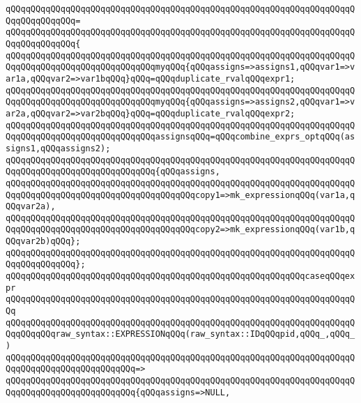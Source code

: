 \verb|qQQqqQQqqQQqqQQqqQQqqQQqqQQqqQQqqQQqqQQqqQQqqQQqqQQqqQQqqQQqqQQqqQQqqQQqqQQqqQQqqQQq=|\newline
\verb|qQQqqQQqqQQqqQQqqQQqqQQqqQQqqQQqqQQqqQQqqQQqqQQqqQQqqQQqqQQqqQQqqQQqqQQqqQQqqQQqqQQq{|\newline
\verb|qQQqqQQqqQQqqQQqqQQqqQQqqQQqqQQqqQQqqQQqqQQqqQQqqQQqqQQqqQQqqQQqqQQqqQQqqQQqqQQqqQQqqQQqqQQqqQQqqQQqmyqQQq{qQQqassigns=>assigns1,qQQqvar1=>var1a,qQQqvar2=>var1bqQQq}qQQq=qQQqduplicate_rvalqQQqexpr1;|\newline
\verb|qQQqqQQqqQQqqQQqqQQqqQQqqQQqqQQqqQQqqQQqqQQqqQQqqQQqqQQqqQQqqQQqqQQqqQQqqQQqqQQqqQQqqQQqqQQqqQQqqQQqmyqQQq{qQQqassigns=>assigns2,qQQqvar1=>var2a,qQQqvar2=>var2bqQQq}qQQq=qQQqduplicate_rvalqQQqexpr2;|\newline
\verb|qQQqqQQqqQQqqQQqqQQqqQQqqQQqqQQqqQQqqQQqqQQqqQQqqQQqqQQqqQQqqQQqqQQqqQQqqQQqqQQqqQQqqQQqqQQqqQQqqQQqassignsqQQq=qQQqcombine_exprs_optqQQq(assigns1,qQQqassigns2);|\newline
\newline
\verb|qQQqqQQqqQQqqQQqqQQqqQQqqQQqqQQqqQQqqQQqqQQqqQQqqQQqqQQqqQQqqQQqqQQqqQQqqQQqqQQqqQQqqQQqqQQqqQQqqQQq{qQQqassigns,|\newline
\verb|qQQqqQQqqQQqqQQqqQQqqQQqqQQqqQQqqQQqqQQqqQQqqQQqqQQqqQQqqQQqqQQqqQQqqQQqqQQqqQQqqQQqqQQqqQQqqQQqqQQqqQQqqQQqcopy1=>mk_expressionqQQq(var1a,qQQqvar2a),|\newline
\verb|qQQqqQQqqQQqqQQqqQQqqQQqqQQqqQQqqQQqqQQqqQQqqQQqqQQqqQQqqQQqqQQqqQQqqQQqqQQqqQQqqQQqqQQqqQQqqQQqqQQqqQQqqQQqcopy2=>mk_expressionqQQq(var1b,qQQqvar2b)qQQq};|\newline
\verb|qQQqqQQqqQQqqQQqqQQqqQQqqQQqqQQqqQQqqQQqqQQqqQQqqQQqqQQqqQQqqQQqqQQqqQQqqQQqqQQqqQQq};|\newline
\newline
\verb|qQQqqQQqqQQqqQQqqQQqqQQqqQQqqQQqqQQqqQQqqQQqqQQqqQQqqQQqqQQqcaseqQQqexpr|\newline
\verb|qQQqqQQqqQQqqQQqqQQqqQQqqQQqqQQqqQQqqQQqqQQqqQQqqQQqqQQqqQQqqQQqqQQqqQQq|\newline
\verb|qQQqqQQqqQQqqQQqqQQqqQQqqQQqqQQqqQQqqQQqqQQqqQQqqQQqqQQqqQQqqQQqqQQqqQQqqQQqqQQqraw_syntax::EXPRESSIONqQQq(raw_syntax::IDqQQqpid,qQQq_,qQQq_)|\newline
\verb|qQQqqQQqqQQqqQQqqQQqqQQqqQQqqQQqqQQqqQQqqQQqqQQqqQQqqQQqqQQqqQQqqQQqqQQqqQQqqQQqqQQqqQQqqQQqqQQq=>|\newline
\verb|qQQqqQQqqQQqqQQqqQQqqQQqqQQqqQQqqQQqqQQqqQQqqQQqqQQqqQQqqQQqqQQqqQQqqQQqqQQqqQQqqQQqqQQqqQQqqQQq{qQQqassigns=>NULL,|\newline
